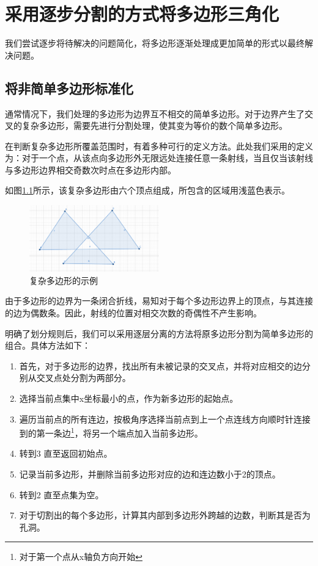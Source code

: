 \chapter{采用逐步分割的方式将多边形三角化}

我们尝试逐步将待解决的问题简化，将多边形逐渐处理成更加简单的形式以最终解决问题。
\section{将非简单多边形标准化}
通常情况下，我们处理的多边形为边界互不相交的简单多边形。对于边界产生了交叉的复杂多边形，需要先进行分割处理，使其变为等价的数个简单多边形。

在判断复杂多边形所覆盖范围时，有着多种可行的定义方法。此处我们采用的定义为：对于一个点，从该点向多边形外无限远处连接任意一条射线，当且仅当该射线与多边形边界相交奇数次时点在多边形内部。

如图\ref*{complex}所示，该复杂多边形由六个顶点组成，所包含的区域用浅蓝色表示。

\begin{figure}[htp]
    \centering
    \includegraphics[width=0.5\textwidth]
    {figures/complex.png}
    \caption{复杂多边形的示例}
    \label{complex}
  \end{figure}

由于多边形的边界为一条闭合折线，易知对于每个多边形边界上的顶点，与其连接的边为偶数条。因此，射线的位置对相交次数的奇偶性不产生影响。

明确了划分规则后，我们可以采用逐层分离的方法将原多边形分割为简单多边形的组合。具体方法如下：

\begin{enumerate}
    \item 首先，对于多边形的边界，找出所有未被记录的交叉点，并将对应相交的边分别从交叉点处分割为两部分。
    \item 选择当前点集中x坐标最小的点，作为新多边形的起始点。
    \item 遍历当前点的所有连边，按极角序选择当前点到上一个点连线方向顺时针连接到的第一条边\footnote{对于第一个点从x轴负方向开始}，将另一个端点加入当前多边形。
    \item 转到3 直至返回初始点。
    \item 记录当前多边形，并删除当前多边形对应的边和连边数小于2的顶点。
    \item 转到2 直至点集为空。
    \item 对于切割出的每个多边形，计算其内部到多边形外跨越的边数，判断其是否为孔洞。
\end{enumerate}

